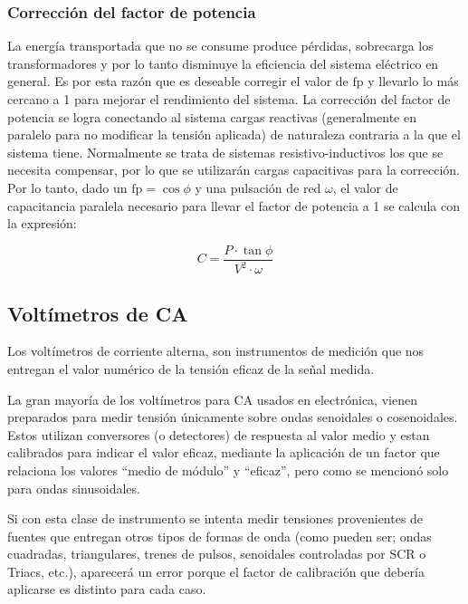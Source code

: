 \label{sec:fp}
\subsubsection{Corrección del factor de potencia}
La energía transportada que no se consume produce pérdidas, sobrecarga los transformadores y por lo tanto disminuye la eficiencia del sistema eléctrico en general. Es por esta razón que es deseable corregir el valor de $\mathrm{fp}$ y llevarlo lo más cercano a 1 para mejorar el rendimiento del sistema. La corrección del factor de potencia se logra conectando al sistema cargas reactivas (generalmente en paralelo para no modificar la tensión aplicada) de naturaleza contraria a la que el sistema tiene. Normalmente se trata de sistemas resistivo-inductivos los que se necesita compensar, por lo que se utilizarán cargas capacitivas para la corrección.
Por lo tanto, dado un $\mathrm{fp} = \cos \phi$ y una pulsación de red $\omega$, el valor de capacitancia paralela necesario para llevar el factor de potencia a 1 se calcula con la expresión:

\begin{equation}
    C = \frac{P\cdot \tan\phi}{V^2\cdot \omega}
    \label{eq:corrFp}
\end{equation}


\subsection{Voltímetros de CA}
\label{sec:VoltCA}

Los voltímetros de corriente alterna, son instrumentos de medición que nos entregan el valor numérico de la tensión eficaz de la señal medida.

La gran mayoría de los voltímetros para CA usados en electrónica, vienen preparados para medir tensión únicamente sobre ondas senoidales o cosenoidales. Estos utilizan conversores (o detectores) de respuesta al valor medio y estan calibrados para indicar el valor eficaz, mediante la aplicación de un factor que relaciona los valores “medio de módulo” y “eficaz”, pero como se mencionó solo para ondas sinusoidales. 

Si con esta clase de instrumento se intenta medir tensiones provenientes de fuentes que entregan otros tipos de formas de onda (como pueden ser; ondas cuadradas, triangulares, trenes de pulsos, senoidales controladas por SCR o Triacs, etc.), aparecerá un error porque el factor de calibración que debería aplicarse es distinto para cada caso. 

